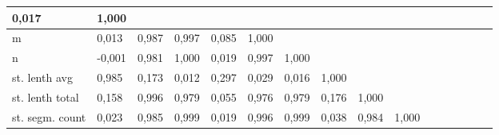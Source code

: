 \begin{spacing}{1}
\begin{landscape}
\begin{table}[H]
\begin{tabular}{|p{2.8cm}|lllllllllllllll|}
          \cellcolor[HTML]{FBFEFD}0,017 &
          \cellcolor[HTML]{00B050}1,000 &
           &
           &
           &
           &
           &
           &
           &
           &
           &
           &
           \\ \hline
        m &
          \cellcolor[HTML]{FCFEFD}0,013 &
          \cellcolor[HTML]{05B253}0,987 &
          \cellcolor[HTML]{01B151}0,997 &
          \cellcolor[HTML]{EAF9F1}0,085 &
          \cellcolor[HTML]{00B050}1,000 &
           &
           &
           &
           &
           &
           &
           &
           &
           &
           \\ \hline
        n &
          \cellcolor[HTML]{FEFEFE}-0,001 &
          \cellcolor[HTML]{05B254} 0,981 &
          \cellcolor[HTML]{01B151} 1,000 &
          \cellcolor[HTML]{FBFEFC} 0,019 &
          \cellcolor[HTML]{01B151} 0,997 &
          \cellcolor[HTML]{00B050} 1,000 &
           &
           &
           &
           &
           &
           &
           &
           &
           \\ \hline
        st. lenth avg &
          \cellcolor[HTML]{04B253}0,985 &
          \cellcolor[HTML]{D3F2E1}0,173 &
          \cellcolor[HTML]{FDFFFD}0,012 &
          \cellcolor[HTML]{B4E8CC}0,297 &
          \cellcolor[HTML]{F8FDFA}0,029 &
          \cellcolor[HTML]{FBFEFD}0,016 &
          \cellcolor[HTML]{00B050}1,000 &
           &
           &
           &
           &
           &
           &
           &
           \\ \hline
        st. lenth total &
          \cellcolor[HTML]{D7F3E4}0,158 &
          \cellcolor[HTML]{01B151}0,996 &
          \cellcolor[HTML]{06B254}0,979 &
          \cellcolor[HTML]{F2FBF6}0,055 &
          \cellcolor[HTML]{07B255}0,976 &
          \cellcolor[HTML]{06B254}0,979 &
          \cellcolor[HTML]{D3F2E1}0,176 &
          \cellcolor[HTML]{00B050}1,000 &
           &
           &
           &
           &
           &
           &
           \\ \hline
        st. segm. count &
          \cellcolor[HTML]{FAFEFC}0,023 &
          \cellcolor[HTML]{04B253}0,985 &
          \cellcolor[HTML]{01B151}0,999 &
          \cellcolor[HTML]{FBFEFC}0,019 &
          \cellcolor[HTML]{01B151}0,996 &
          \cellcolor[HTML]{01B151}0,999 &
          \cellcolor[HTML]{F6FCF9}0,038 &
          \cellcolor[HTML]{04B253}0,984 &
          \cellcolor[HTML]{00B050}1,000 &
           &
           &
           &
           &
           &
           \\ \hline

\end{tabular}
\end{table}
\end{landscape}
\end{spacing}
